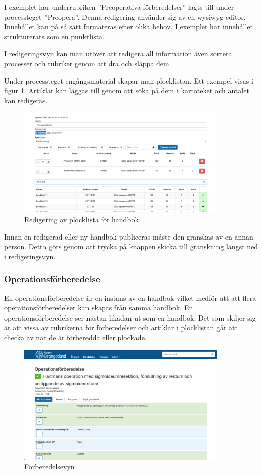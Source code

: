 I exemplet har underrubriken ''Preoperativa förberedelser'' lagts till under processteget ''Preopera''. Denna redigering använder sig av en wysiwyg-editor. Innehållet kan på så sätt formateras efter olika behov. I exemplet har innehållet strukturerats som en punktlista. 

I redigeringsvyn kan man utöver att redigera all information även sortera processer och rubriker genom att dra och släppa dem.

Under processteget engångsmaterial skapar man plocklistan. Ett exempel visas i figur \ref{fig:plocklistaredigering2}. Artiklar kan läggas till genom att söka på dem i kartoteket och antalet kan redigeras.

\begin{figure}[h!]
  \centering
  \includegraphics[width=0.9\textwidth]{images/site/plocklistaredigering2}
  \caption{Redigering av plocklista för handbok}
  \label{fig:plocklistaredigering2}
\end{figure}


Innan en redigerad eller ny handbok publiceras måste den granskas av en annan person. Detta görs genom att trycka på knappen skicka till granskning längst ned i redigeringsvyn.

\subsubsection{Operationsförberedelse}
En operationsförberedelse är en instans av en handbok vilket medför att att flera operationsförberedelser kan skapas från samma handbok. En operationsförberedelse ser nästan likadan ut som en handbok.
Det som skiljer sig är att vissa av rubrikerna för förberedelser och artiklar i plocklistan går att checka av när de är förberedda eller plockade.

\begin{figure}[h!]
  \centering
  \includegraphics[width=0.9\textwidth]{images/site/op}
  \caption{Förberedelsevyn}
  \label{fig:op}
\end{figure}

